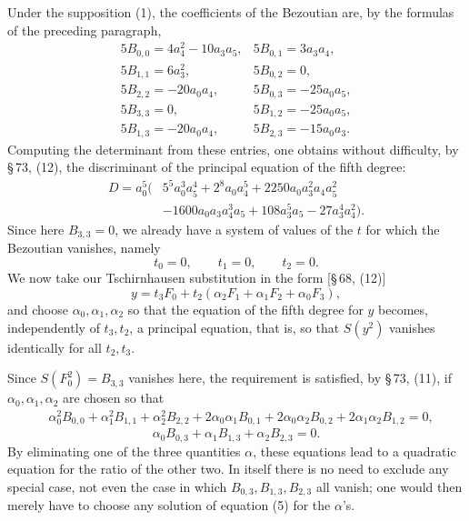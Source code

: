\documentclass[11pt]{article}
\begin{document}
Under the supposition (1), the coefficients of the Bezoutian are, by the formulas of the preceding paragraph,
\begin{equation}
\begin{array}{ll}
5B_{0,0}=4a_4^2-10a_3a_5, & 5B_{0,1}=3a_3a_4,\\
5B_{1,1}=6a_3^2, & 5B_{0,2}=0,\\
5B_{2,2}=-20a_0a_4, & 5B_{0,3}=-25a_0a_5,\\
5B_{3,3}=0, & 5B_{1,2}=-25a_0a_5,\\
5B_{1,3}=-20a_0a_4, & 5B_{2,3}=-15a_0a_3.
\end{array}
\tag{2}
\end{equation}
Computing the determinant from these entries, one obtains without difficulty, by \S\,73, (12), the discriminant of the principal equation of the fifth degree:
\begin{equation}
\begin{aligned}
D=a_0^5(&5^5a_0^3a_5^4+2^8a_0a_4^5+2250a_0a_3^2a_4a_5^2\\
&-1600a_0a_3a_4^3a_5+108a_3^5a_5-27a_3^4a_4^2).
\end{aligned}
\tag{3}
\end{equation}
Since here $B_{3,3}=0$, we already have a system of values of the $t$ for which the Bezoutian vanishes, namely
\[
 t_0=0,
 \qquad t_1=0,
 \qquad t_2=0.
\]
We now take our Tschirnhausen substitution in the form [\S\,68, (12)]
\begin{equation}
 y=t_3F_0+t_2(\alpha_2F_1+\alpha_1F_2+\alpha_0F_3),
\tag{4}
\end{equation}
and choose $\alpha_0,\alpha_1,\alpha_2$ so that the equation of the fifth degree for $y$ becomes, independently of $t_3,t_2$, a principal equation, that is, so that $S(y^2)$ vanishes identically for all $t_2,t_3$.

Since $S(F_0^2)=B_{3,3}$ vanishes here, the requirement is satisfied, by \S\,73, (11), if $\alpha_0,\alpha_1,\alpha_2$ are chosen so that
\begin{equation}
\begin{aligned}
&\alpha_0^2B_{0,0}+\alpha_1^2B_{1,1}+\alpha_2^2B_{2,2}
+2\alpha_0\alpha_1B_{0,1}+2\alpha_0\alpha_2B_{0,2}+2\alpha_1\alpha_2B_{1,2}=0,
\end{aligned}
\tag{5}
\end{equation}
\begin{equation}
 \alpha_0B_{0,3}+\alpha_1B_{1,3}+\alpha_2B_{2,3}=0.
\tag{6}
\end{equation}
By eliminating one of the three quantities $\alpha$, these equations lead to a quadratic equation for the ratio of the other two. In itself there is no need to exclude any special case, not even the case in which $B_{0,3},B_{1,3},B_{2,3}$ all vanish; one would then merely have to choose any solution of equation (5) for the $\alpha$'s.
\end{document}
